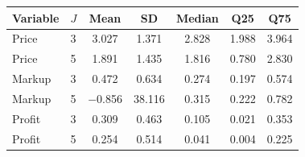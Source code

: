 \begin{tabular}{llccccc}
\toprule
Variable & $J$ & Mean & SD & Median & Q25 & Q75 \\
\midrule
Price & 3 & 3.027 & 1.371 & 2.828 & 1.988 & 3.964 \\
Price & 5 & 1.891 & 1.435 & 1.816 & 0.780 & 2.830 \\
\midrule
Markup & 3 & 0.472 & 0.634 & 0.274 & 0.197 & 0.574 \\
Markup & 5 & $-$0.856 & 38.116 & 0.315 & 0.222 & 0.782 \\
\midrule
Profit & 3 & 0.309 & 0.463 & 0.105 & 0.021 & 0.353 \\
Profit & 5 & 0.254 & 0.514 & 0.041 & 0.004 & 0.225 \\
\bottomrule
\end{tabular}
